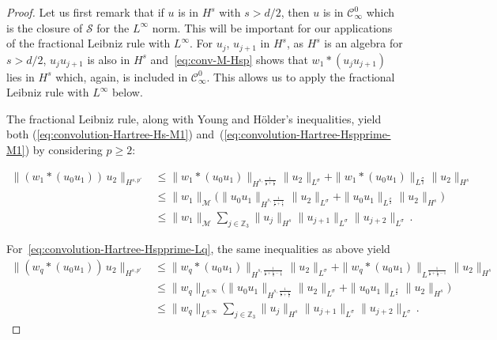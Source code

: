 \documentclass[12pt]{article}
\theoremstyle{plain}
\newcommand{\meas}{\mathcal{M}}
\begin{document}
\begin{proof}Let us first remark that if $u$ is in $H^s$ with $s>d/2$, then $u$ is in $\mathcal{C}^0_\infty$ which is the closure of $\mathcal{S}$ for the $L^\infty$ norm. This will be important for our applications of the fractional Leibniz rule with $L^\infty$. 
For $u_j$, $u_{j+1}$ in $H^s$, as $H^s$ is an algebra for $s>d/2$, $u_ju_{j+1}$ is also in $H^s$ and~\eqref{eq:conv-M-Hsp} shows that $w_1*(u_ju_{j+1})$ lies in $H^s$ which, again, is included in $\mathcal{C}^0_\infty$. This allows us to apply the fractional Leibniz rule with $L^\infty$ below.





The fractional Leibniz rule, along with Young and H\"older's inequalities, yield both (\ref{eq:convolution-Hartree-Hs-M1}) and~(\ref{eq:convolution-Hartree-Hspprime-M1}) by considering $p\geq 2$:

\begin{align*}
 \|(w_{1}*(u_{0}u_{1}))\,u_{2}\|_{H^{s,p'}} & \leq\|w_{1}*(u_{0}u_{1})\|_{H^{s,\frac{1}{\frac{1}{\sigma}+\frac{1}{2}}}}\|u_{2}\|_{L^{\sigma}}+\|w_{1}*(u_{0}u_{1})\|_{L^{\frac{\sigma}{2}}}\|u_{2}\|_{H^{s}}\\
 & \leq\|w_{1}\|_{\meas}\big(\|u_{0}u_{1}\|_{H^{s,\frac{1}{\frac{1}{\sigma}+\frac{1}{2}}}}\|u_{2}\|_{L^{\sigma}}+\|u_{0}u_{1}\|_{L^{\frac{\sigma}{2}}}\|u_{2}\|_{H^{s}}\big)\\
 & \leq\|w_{1}\|_{\meas}\sum_{j\in\mathbb{Z}_{3}}\|u_{j}\|_{H^{s}}\|u_{j+1}\|_{L^{\sigma}}\|u_{j+2}\|_{L^{\sigma}}\,.
\end{align*}


For~\eqref{eq:convolution-Hartree-Hspprime-Lq}, the same inequalities as above yield
\begin{align*}
  \|(w_{q}*(u_{0}u_{1}))\,u_{2}\|_{H^{s,p'}}
 & \leq\|w_{q}*(u_{0}u_{1})\|_{H^{s,\frac{1}{\frac{1}{\sigma}+\frac{1}{q}-\frac{1}{2}}}}\|u_{2}\|_{L^{\sigma}}+\|w_{q}*(u_{0}u_{1})\|_{L^{\frac{1}{\frac{2}{\sigma}+\frac{1}{q}-1}}}\|u_{2}\|_{H^{s}}\\
 & \leq\|w_{q}\|_{L^{q,\infty}}\big(\|u_{0}u_{1}\|_{H^{s,\frac{1}{\frac{1}{\sigma}+\frac{1}{2}}}}\|u_{2}\|_{L^{\sigma}}+\|u_{0}u_{1}\|_{L^{\frac{\sigma}{2}}}\|u_{2}\|_{H^{s}}\big)\\
 & \leq\|w_{q}\|_{L^{q,\infty}}\sum_{j\in\mathbb{Z}_{3}}\|u_{j}\|_{H^{s}}\|u_{j+1}\|_{L^{\sigma}}\|u_{j+2}\|_{L^{\sigma}}\,.
\end{align*}


\end{proof}
\end{document}
